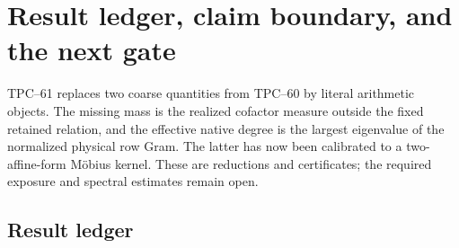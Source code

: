 \section{Result ledger, claim boundary, and the next gate}
\label{sec:tpc61-claims-next}

TPC--61 replaces two coarse quantities from TPC--60 by literal arithmetic
objects.  The missing mass is the realized cofactor measure outside the
fixed retained relation, and the effective native degree is the largest
eigenvalue of the normalized physical row Gram.  The latter has now been
calibrated to a two-affine-form M\"obius kernel.  These are reductions and
certificates; the required exposure and spectral estimates remain open.

\subsection{Result ledger}

